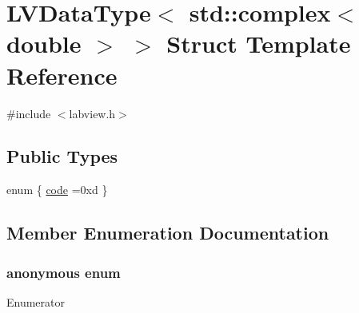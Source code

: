 \hypertarget{struct_l_v_data_type_3_01std_1_1complex_3_01double_01_4_01_4}{}\section{L\+V\+Data\+Type$<$ std\+:\+:complex$<$ double $>$ $>$ Struct Template Reference}
\label{struct_l_v_data_type_3_01std_1_1complex_3_01double_01_4_01_4}


{\ttfamily \#include $<$labview.\+h$>$}

\subsection*{Public Types}
\begin{DoxyCompactItemize}
\item 
enum \{ \hyperlink{struct_l_v_data_type_3_01std_1_1complex_3_01double_01_4_01_4_a37d2b262a42ce4f252af70c7f95dc10aa3496678bd5469fe179bef82b9ffef476}{code} =0xd
 \}
\end{DoxyCompactItemize}


\subsection{Member Enumeration Documentation}
\subsubsection[{\texorpdfstring{anonymous enum}{anonymous enum}}]{\setlength{\rightskip}{0pt plus 5cm}anonymous enum}\hypertarget{struct_l_v_data_type_3_01std_1_1complex_3_01double_01_4_01_4_a37d2b262a42ce4f252af70c7f95dc10a}{}\label{struct_l_v_data_type_3_01std_1_1complex_3_01double_01_4_01_4_a37d2b262a42ce4f252af70c7f95dc10a}
\begin{Desc}
\item[Enumerator]\par
\begin{description}
\item[{\em 
code\hypertarget{struct_l_v_data_type_3_01std_1_1complex_3_01double_01_4_01_4_a37d2b262a42ce4f252af70c7f95dc10aa3496678bd5469fe179bef82b9ffef476}{}\label{struct_l_v_data_type_3_01std_1_1complex_3_01double_01_4_01_4_a37d2b262a42ce4f252af70c7f95dc10aa3496678bd5469fe179bef82b9ffef476}
}]\end{description}
\end{Desc}

